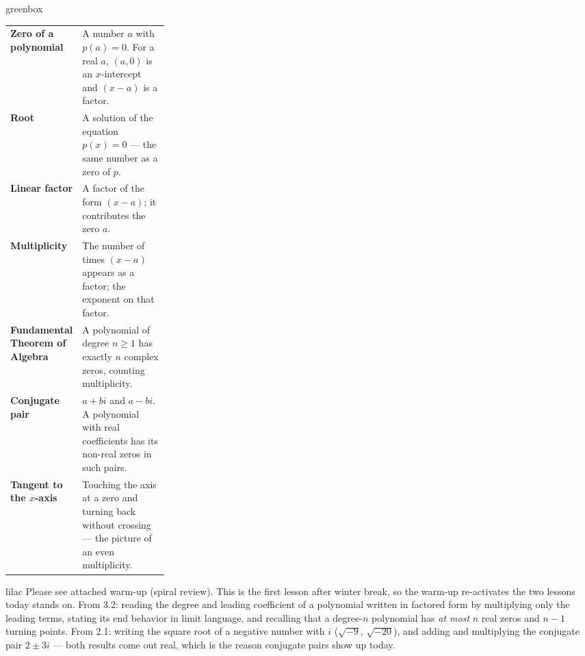 \documentclass[10pt]{article}
\begin{document}
\begin{skillbox}{greenbox}
\renewcommand{\arraystretch}{1.4}
\begin{tabularx}{\linewidth}{@{} >{\leavevmode\bfseries\color{plum}}p{0.27\linewidth} X @{}}
Zero of a polynomial & A number $a$ with $p(a) = 0$. For a real $a$, $(a, 0)$ is an $x$-intercept and $(x - a)$ is a factor. \\
Root & A solution of the equation $p(x) = 0$ --- the same number as a zero of $p$. \\
Linear factor & A factor of the form $(x - a)$; it contributes the zero $a$. \\
Multiplicity & The number of times $(x - a)$ appears as a factor; the exponent on that factor. \\
Fundamental Theorem of Algebra & A polynomial of degree $n \ge 1$ has exactly $n$ complex zeros, counting multiplicity. \\
Conjugate pair & $a + bi$ and $a - bi$. A polynomial with real coefficients has its non-real zeros in such pairs. \\
Tangent to the $x$-axis & Touching the axis at a zero and turning back without crossing --- the picture of an even multiplicity. \\
\end{tabularx}
\end{skillbox}

\begin{skillbox}{lilac}
    Please see attached warm-up (spiral review). This is the first lesson after winter break,
    so the warm-up re-activates the two lessons today stands on. From 3.2: reading the degree
    and leading coefficient of a polynomial written in factored form by multiplying only the
    leading terms, stating its end behavior in limit language, and recalling that a degree-$n$
    polynomial has \textit{at most} $n$ real zeros and $n - 1$ turning points. From 2.1:
    writing the square root of a negative number with $i$ ($\sqrt{-9}$, $\sqrt{-20}$), and
    adding and multiplying the conjugate pair $2 \pm 3i$ --- both results come out real, which
    is the reason conjugate pairs show up today.
\end{skillbox}
\end{document}
